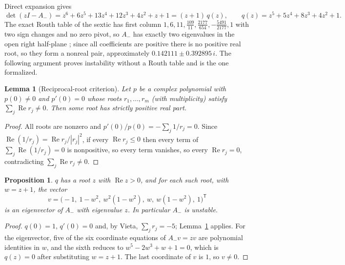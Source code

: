 \documentclass[11pt,a4paper]{article}
\theoremstyle{plain}
\newtheorem{proposition}[theorem]{Proposition}
\newtheorem{lemma}[theorem]{Lemma}
\theoremstyle{definition}
\theoremstyle{remark}
\newcommand{\Aminus}{A_{-}}
\newcommand{\T}{\mathsf T}
\DeclareMathOperator{\Ree}{Re}
\begin{document}
Direct expansion gives
\begin{equation}\label{eq:pminus}
\det(zI-\Aminus)=z^6+6z^5+13z^4+12z^3+4z^2+z+1=(z+1)\,q(z),\qquad
q(z)=z^5+5z^4+8z^3+4z^2+1 .
\end{equation}
The exact Routh table of the sextic has first column $1,6,11,\tfrac{109}{11},\tfrac{2177}{654},-\tfrac{5491}{2177},1$ with two sign changes and no zero pivot, so $\Aminus$ has exactly two eigenvalues in the open right half-plane \citep[Chapter~XV]{Gantmacher1959}; since all coefficients are positive there is no positive real root, so they form a nonreal pair, approximately $0.142111\pm0.392895\,i$. The following argument proves instability without a Routh table and is the one formalized.

\begin{lemma}[Reciprocal-root criterion]\label{lem:reciprocal}
Let $p$ be a complex polynomial with $p(0)\neq0$ and $p'(0)=0$ whose roots $r_1,\dots,r_m$ (with multiplicity) satisfy $\sum_j\Ree r_j\neq0$. Then some root has strictly positive real part.
\end{lemma}
\begin{proof}
All roots are nonzero and $p'(0)/p(0)=-\sum_j 1/r_j=0$. Since $\Ree(1/r_j)=\Ree r_j/|r_j|^2$, if every $\Ree r_j\le0$ then every term of $\sum_j\Ree(1/r_j)=0$ is nonpositive, so every term vanishes, so every $\Ree r_j=0$, contradicting $\sum_j\Ree r_j\ne0$.
\end{proof}

\begin{proposition}\label{prop:neginstability}
$q$ has a root $z$ with $\Ree z>0$, and for each such root, with $w=z+1$, the vector
\begin{equation}\label{eq:negeigen}
v=\bigl(-1,\ 1-w^2,\ w^2(1-w^2),\ w,\ w(1-w^2),\ 1\bigr)^{\T}
\end{equation}
is an eigenvector of $\Aminus$ with eigenvalue $z$. In particular $\Aminus$ is unstable.
\end{proposition}
\begin{proof}
$q(0)=1$, $q'(0)=0$ and, by Vieta, $\sum_j r_j=-5$; Lemma~\ref{lem:reciprocal} applies. For the eigenvector, five of the six coordinate equations of $\Aminus v=zv$ are polynomial identities in $w$, and the sixth reduces to $w^5-2w^3+w+1=0$, which is $q(z)=0$ after substituting $w=z+1$. The last coordinate of $v$ is $1$, so $v\neq0$.
\end{proof}
\end{document}

